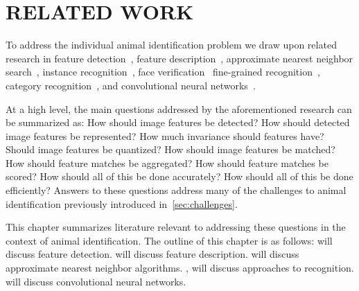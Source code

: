 \begin{comment}
    ./texfix.py --fixcap --dryrun
    ./texfix.py --findcite --unused-important
    ./texfix.py --findcite --close-keys
    fixtex --fpaths chapter2-related-work.tex --outline --asmarkdown --numlines=999 --shortcite -w && ./checklang.py outline_chapter2-related-work.md
\end{comment}

\chapter{RELATED WORK}\label{chap:relatedwork} 

    To address the individual animal identification problem we draw upon related research in %
    feature detection~\cite{mikolajczyk_comparison_2005,tuytelaars_local_2008, perdoch_efficient_2009}, %
    feature description~\cite{lowe_distinctive_2004, mikolajczyk_performance_2005,simonyan_learning_2014,
      winder_picking_2009,zagoruyko_learning_2015,han_matchnet_2015}, %
    approximate nearest neighbor search~\cite{silpa_anan_optimised_2008, muja_fast_2009}, %
    instance recognition~\cite{sivic_efficient_2009,nister_scalable_2006,
      philbin_object_2007,jegou_hamming_2008,bo_efficient_2009, jegou_aggregating_2012, tolias_aggregate_2013}, %
    face verification~\cite{chopra_learning_2005,huang_labeled_2007,berg_tom_vs_pete_2012,
      chen_blessing_2013,taigman_deepface_2014} %
    fine-grained recognition~\cite{parkhi_cats_2012,berg_poof_2013, gavves_local_2014}, %
    category recognition~\cite{lazebnik_beyond_2006,zhang_local_2006,
      mccann_local_2012,boiman_defense_2008,sanchez_compressed_2013}, %
    and convolutional neural networks~\cite{krizhevsky_imagenet_2012, razavian_cnn_2014,
      zagoruyko_learning_2015,han_matchnet_2015,arandjelovic_netvlad_2016}.

    At a high level, the main questions addressed by the aforementioned research can be summarized as: How should image
    features be detected? How should detected image features be represented? How much invariance should features
    have? Should image features be quantized? How should image features be matched? How should feature matches be
    aggregated? How should feature matches be scored? How should all of this be done accurately? How should all of
    this be done efficiently? Answers to these questions address many of the challenges to animal identification
    previously introduced in~\cref{sec:challenges}.

    This chapter summarizes literature relevant to addressing these questions in the context of animal
    identification. The outline of this chapter is as follows:  will discuss feature
    detection.  will discuss feature description.  will discuss approximate
    nearest neighbor algorithms. , will discuss approaches to recognition.
     will discuss convolutional neural networks.


